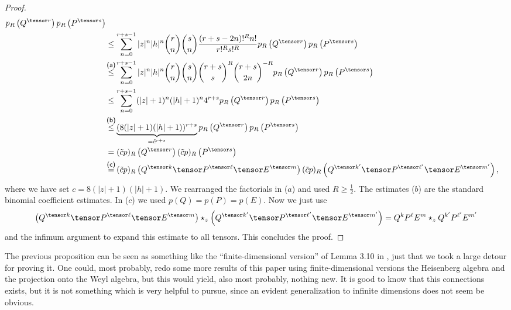 \begin{proof}
\begin{align*}
        p_R \left(Q^{\tensor r} \right)
        p_R \left(P^{\tensor s} \right)
        \\
        & \leq
        \sum\limits_{n=0}^{r + s - 1}
        |z|^n |h|^n
        \binom{r}{n} \binom{s}{n}
        \frac{(r + s - 2n)!^R n!}{r!^R s!^R}
        p_R \left(Q^{\tensor r} \right)
        p_R \left(P^{\tensor s} \right)
        \\
        & \ot{(a)}{\leq}
        \sum\limits_{n=0}^{r + s - 1}
        |z|^n |h|^n
        \binom{r}{n} \binom{s}{n}
        \binom{r + s}{s}^R
        \binom{r + s}{2n}^{-R}
        p_R \left(Q^{\tensor r} \right)
        p_R \left(P^{\tensor s} \right)
        \\
        & \leq
        \sum\limits_{n=0}^{r + s - 1}
        (|z| + 1)^n (|h| + 1)^n
        4^{r + s}
        p_R \left(Q^{\tensor r} \right)
        p_R \left(P^{\tensor s} \right)
        \\
        & \ot{(b)}{ \leq }
        \underbrace{
        (8 (|z| + 1) (|h| + 1))^{r + s}
        }_{ = \tilde{c}^{r + s}}
        p_R \left(Q^{\tensor r} \right)
        p_R \left(P^{\tensor s} \right)
        \\
        & =
        (\tilde{c} p)_R \left(Q^{\tensor r} \right)
        (\tilde{c} p)_R \left(P^{\tensor s} \right)
        \\
        & \ot{(c)}{ = }
        (\tilde{c} p)_R \left(
        Q^{\tensor k} \tensor
        P^{\tensor \ell} \tensor
        E^{\tensor m} \right)
        (\tilde{c} p)_R \left(
        Q^{\tensor k'} \tensor
        P^{\tensor \ell'} \tensor
        E^{\tensor m'} \right),
    \end{align*}
    where we have set $c = 8 (|z| + 1) (|h| + 1)$. We rearranged the factorials in 
    ($a$) and used $R \geq \frac{1}{2}$. The estimates ($b$) are the standard 
    binomial coefficient estimates. In ($c$) we used $p(Q) = p(P) = p(E)$. Now
    we just use
    \begin{equation*}
        \left(
        	Q^{\tensor k} \tensor
        	P^{\tensor \ell} \tensor
        	E^{\tensor m}
        \right)
        \ostar_z
        \left(
        	Q^{\tensor k'} \tensor
        	P^{\tensor \ell'} \tensor
        	E^{\tensor m'}
        \right)
        =
        Q^k P^{\ell} E^m
        \ostar_z
        Q^{k'} P^{\ell'} E^{m'}
    \end{equation*}
    and the infimum argument to expand this estimate to all tensors.
    This concludes the proof.
\end{proof}
The previous proposition can be seen as something like the ``finite-dimensional 
version'' of Lemma 3.10 in \cite{waldmann:2014a}, just that we took a large 
detour for proving it. One could, most probably, redo some more results of this 
paper using finite-dimensional versions the Heisenberg algebra and the 
projection onto the Weyl algebra, but this would yield, also most probably, 
nothing new. It is good to know that this connections exists, but it is not 
something which is very helpful to pursue, since an evident generalization to 
infinite dimensions does not seem be obvious.




